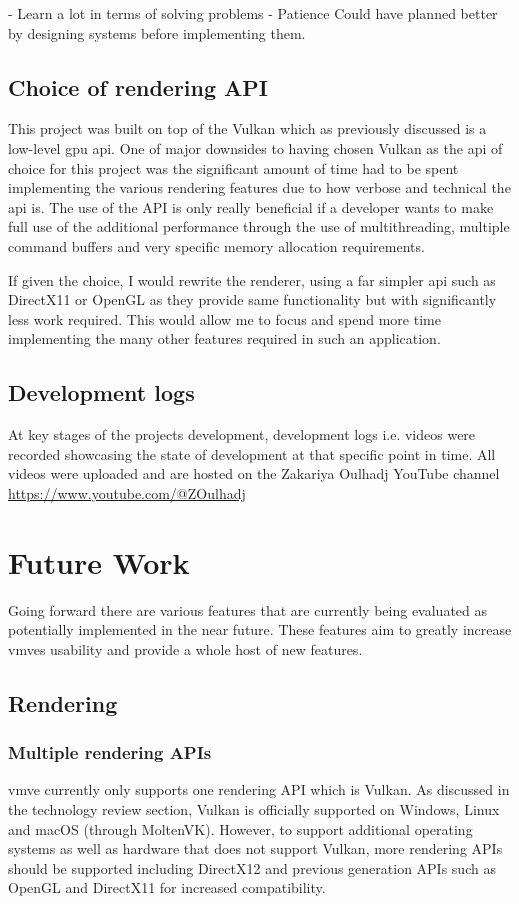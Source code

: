 \documentclass[11pt]{article}
\begin{document}
- Learn a lot in terms of solving problems
- Patience
Could have planned better by designing systems before implementing them.


\subsection{Choice of rendering API}
This project was built on top of the Vulkan which as previously discussed is a
low-level \gls{gpu} \gls{api}. One of major downsides to having chosen Vulkan as
the \gls{api} of choice for this project was the significant amount of time had
to be spent implementing the various rendering features due to how verbose and
technical the \gls{api} is. The use of the API is only really beneficial if a
developer wants to make full use of the additional performance through the use
of multithreading, multiple command buffers and very specific memory allocation
requirements.

If given the choice, I would rewrite the renderer, using a far simpler \gls{api}
such as DirectX11 or OpenGL as they provide same functionality but with
significantly less work required. This would allow me to focus and spend more time 
implementing the many other features required in such an application.

\subsection{Development logs}
At key stages of the projects development, development logs i.e. videos were
recorded showcasing the state of development at that specific point in time. All
videos were uploaded and are hosted on the Zakariya Oulhadj YouTube channel
\url{https://www.youtube.com/@ZOulhadj}

\section{Future Work}
Going forward there are various features that are currently being evaluated as
potentially implemented in the near future. These features aim to greatly
increase \glspl{vmve} usability and provide a whole host of new features.

\subsection{Rendering}

\subsubsection{Multiple rendering APIs}
\gls{vmve} currently only supports one rendering API which is Vulkan. As
discussed in the technology review section, Vulkan is officially supported on
Windows, Linux and macOS (through MoltenVK). However, to support additional
operating systems as well as hardware that does not support Vulkan, more
rendering APIs should be supported including DirectX12 and previous generation
APIs such as OpenGL and DirectX11 for increased compatibility.
\end{document}
